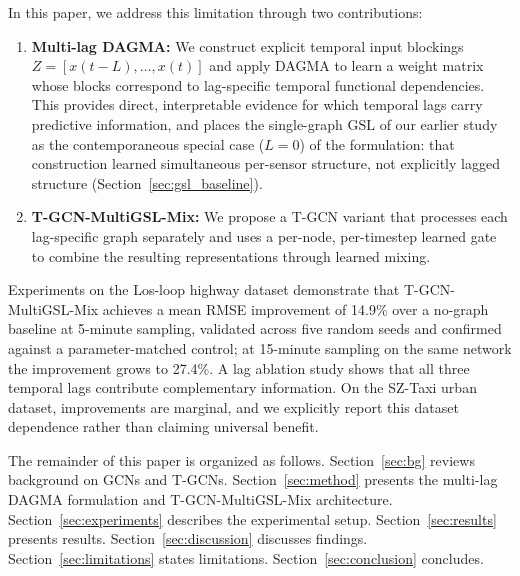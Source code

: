 In this paper, we address this limitation through two contributions:

\begin{enumerate}
    \item \textbf{Multi-lag DAGMA:} We construct explicit temporal input blockings $Z = [x(t{-}L), \ldots, x(t)]$ and apply DAGMA to learn a weight matrix whose blocks correspond to lag-specific temporal functional dependencies. This provides direct, interpretable evidence for which temporal lags carry predictive information, and places the single-graph GSL of our earlier study \citep{Amintoosi1403aimc55-GSL} as the contemporaneous special case ($L=0$) of the formulation: that construction learned simultaneous per-sensor structure, not explicitly lagged structure (Section~\ref{sec:gsl_baseline}).

    \item \textbf{T-GCN-MultiGSL-Mix:} We propose a T-GCN variant that processes each lag-specific graph separately and uses a per-node, per-timestep learned gate to combine the resulting representations through learned mixing.
\end{enumerate}

Experiments on the Los-loop highway dataset demonstrate that T-GCN-MultiGSL-Mix achieves a mean RMSE improvement of 14.9\% over a no-graph baseline at 5-minute sampling, validated across five random seeds and confirmed against a parameter-matched control; at 15-minute sampling on the same network the improvement grows to 27.4\%. A lag ablation study shows that all three temporal lags contribute complementary information. On the SZ-Taxi urban dataset, improvements are marginal, and we explicitly report this dataset dependence rather than claiming universal benefit.

The remainder of this paper is organized as follows. Section~\ref{sec:bg} reviews background on GCNs and T-GCNs. Section~\ref{sec:method} presents the multi-lag DAGMA formulation and T-GCN-MultiGSL-Mix architecture. Section~\ref{sec:experiments} describes the experimental setup. Section~\ref{sec:results} presents results. Section~\ref{sec:discussion} discusses findings. Section~\ref{sec:limitations} states limitations. Section~\ref{sec:conclusion} concludes.
